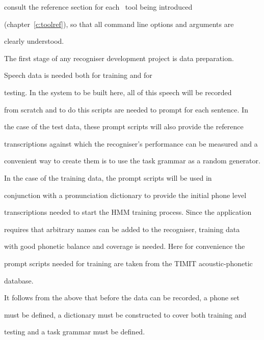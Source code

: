 consult the reference section for each \HTK\ tool being introduced


(chapter~\ref{c:toolref}), so that all command line options and arguments are


clearly understood.










The first stage of any recogniser development project is data preparation.


  Speech data is needed both for training and for


testing.  In the system to be built here, all of this speech will be recorded


from scratch and to do this scripts are needed to prompt for each sentence.  In


the case of the test data, these prompt scripts will also provide the reference


transcriptions against which the recogniser's performance can be measured and a


convenient way to create them is to use the task grammar as a random generator.


In the case of the training data, the prompt scripts will be used in


conjunction with a pronunciation dictionary to provide the initial phone level


transcriptions needed to start the HMM training process.  Since the application


requires that arbitrary names can be added to the recogniser, training data


with good phonetic balance and coverage is needed.  Here for convenience the


prompt scripts needed for training are taken from the TIMIT acoustic-phonetic


database.





It follows from the above that before the data can be recorded, a phone set


must be defined, a dictionary must be constructed to cover both training and


testing and a task grammar must be defined.





